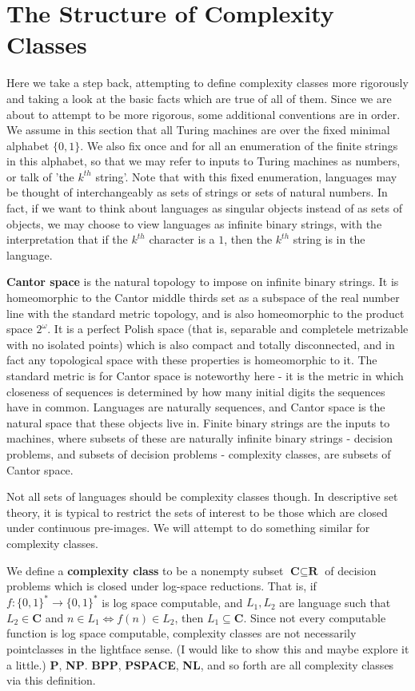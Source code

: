 \section{The Structure of Complexity Classes}
Here we take a step back, attempting to define complexity classes more rigorously and taking a look at the basic facts which are true of all of them. Since we are about to attempt to be more rigorous, some additional conventions are in order. We assume in this section that all Turing machines are over the fixed minimal alphabet $\{0,1\}$. We also fix once and for all an enumeration of the finite strings in this alphabet, so that we may refer to inputs to Turing machines as numbers, or talk of 'the $k^{th}$ string'. Note that with this fixed enumeration, languages may be thought of interchangeably as sets of strings or sets of natural numbers. In fact, if we want to think about languages as singular objects instead of as sets of objects, we may choose to view languages as infinite binary strings, with the interpretation that if the $k^{th}$ character is a $1$, then the $k^{th}$ string is in the language.
\par \textbf{Cantor space} is the natural topology to impose on infinite binary strings. It is homeomorphic to the Cantor middle thirds set as a subspace of the real number line with the standard metric topology, and is also homeomorphic to the product space $2^{\omega}$. It is a perfect Polish space (that is, separable and completele metrizable with no isolated points) which is also compact and totally disconnected, and in fact any topological space with these properties is homeomorphic to it. The standard metric is for Cantor space is noteworthy here - it is the metric in which closeness of sequences is determined by how many initial digits the sequences have in common. Languages are naturally sequences, and Cantor space is the natural space that these objects live in. Finite binary strings are the inputs to machines, where subsets of these are naturally infinite binary strings - decision problems, and subsets of decision problems - complexity classes, are subsets of Cantor space. 
\par Not all sets of languages should be complexity classes though. In descriptive set theory, it is typical to restrict the sets of interest to be those which are closed under continuous pre-images. We will attempt to do something similar for complexity classes.
 \par We define a \textbf{complexity class} to be a nonempty subset $\textbf{C} \subseteq \textbf{R}$ of decision problems which is closed under log-space reductions. That is, if $f:\{0,1\}^* \to \{0,1\}^*$ is log space computable, and $L_1,L_2$ are language such that $L_2 \in \textbf{C}$ and $n \in L_1 \iff f(n) \in L_2$, then $L_1 \subseteq \textbf{C}$. Since not every computable function is log space computable, complexity classes are not necessarily pointclasses in the lightface sense. (I would like to show this and maybe explore it a little.) \textbf{P}, \textbf{NP}. \textbf{BPP}, \textbf{PSPACE}, \textbf{NL}, and so forth are all complexity classes via this definition.
